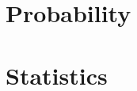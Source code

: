 \documentclass[11pt,a4paper,openright]{book}
\begin{document}
\maketitle










\tableofcontents

\mainmatter

\part{Probability}











\part{Statistics}

\backmatter

\printbibliography
\end{document}
